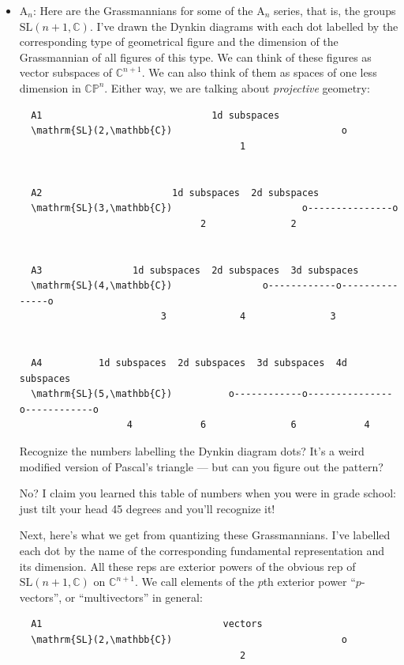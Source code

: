 \documentclass{article}
\begin{document}
\begin{itemize}
\item
  \(\mathrm{A}_n\): Here are the Grassmannians for some of the
  \(\mathrm{A}_n\) series, that is, the groups
  \(\mathrm{SL}(n+1,\mathbb{C})\). I've drawn the Dynkin diagrams with
  each dot labelled by the corresponding type of geometrical figure and
  the dimension of the Grassmannian of all figures of this type. We can
  think of these figures as vector subspaces of \(\mathbb{C}^{n+1}\). We
  can also think of them as spaces of one less dimension in
  \(\mathbb{CP}^n\). Either way, we are talking about \emph{projective}
  geometry:

\begin{verbatim}
  A1                              1d subspaces
  \mathrm{SL}(2,\mathbb{C})                              o
                                       1


  A2                       1d subspaces  2d subspaces
  \mathrm{SL}(3,\mathbb{C})                       o---------------o
                                2               2


  A3                1d subspaces  2d subspaces  3d subspaces
  \mathrm{SL}(4,\mathbb{C})                o------------o---------------o
                         3             4               3


  A4          1d subspaces  2d subspaces  3d subspaces  4d subspaces
  \mathrm{SL}(5,\mathbb{C})          o------------o---------------o------------o
                   4            6               6            4
\end{verbatim}

  Recognize the numbers labelling the Dynkin diagram dots? It's a weird
  modified version of Pascal's triangle --- but can you figure out the
  pattern?

  No? I claim you learned this table of numbers when you were in grade
  school: just tilt your head 45 degrees and you'll recognize it!

  Next, here's what we get from quantizing these Grassmannians. I've
  labelled each dot by the name of the corresponding fundamental
  representation and its dimension. All these reps are exterior powers
  of the obvious rep of \(\mathrm{SL}(n+1,\mathbb{C})\) on
  \(\mathbb{C}^{n+1}\). We call elements of the \(p\)th exterior power
  ``\(p\)-vectors'', or ``multivectors'' in general:

\begin{verbatim}
  A1                                vectors 
  \mathrm{SL}(2,\mathbb{C})                              o
                                       2



\end{verbatim}
\end{itemize}
\end{document}
